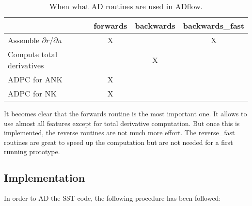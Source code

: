 \begin{table}[H]
    \centering
    \begin{tabular}{l c c c}
        \toprule
                                            & forwards  & backwards     & 
                                            backwards\_fast \\
        \midrule
        Assemble $\partial r / \partial u$  &  X        &               & X \\ 
        Compute total derivatives           &           & X             &   \\
        ADPC for ANK                        &  X        &               &   \\
        ADPC for NK                         &  X        &               &   \\
        \bottomrule
    \end{tabular}
    \caption{When what AD routines are used in ADflow.}
    \label{tab:ad_routines}
\end{table}

\noindent It becomes clear that the forwards routine is the most important one.
It allows to use almost all features except for total derivative computation.
But once this is implemented, the reverse routines are not much more effort.
The reverse\_fast routines are great to speed up the computation but are not
needed for a first running prototype.




\subsection{Implementation}
In order to AD the SST code, the following procedure has been followed:

